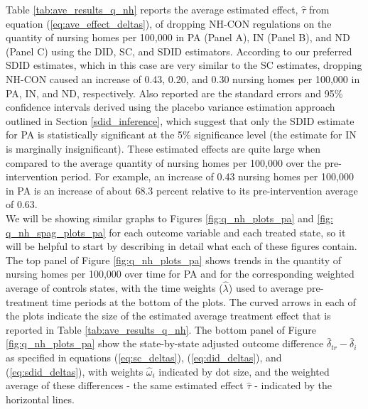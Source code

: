\documentclass[../Main.tex]{subfiles}
\begin{document}
\indent Table \ref{tab:ave_results_q_nh} reports the average estimated effect, $\hat{\tau}$ from equation (\ref{eq:ave_effect_deltas}), of dropping NH-CON regulations on the quantity of nursing homes per 100,000 in PA (Panel A), IN (Panel B), and ND (Panel C) using the DID, SC, and SDID estimators. According to our preferred SDID estimates, which in this case are very similar to the SC estimates, dropping NH-CON caused an increase of 0.43, 0.20, and 0.30 nursing homes per 100,000 in PA, IN, and ND, respectively. Also reported are the standard errors and 95\% confidence intervals derived using the placebo variance estimation approach outlined in Section \ref{sdid_inference}, which suggest that only the SDID estimate for PA is statistically significant at the 5\% significance level (the estimate for IN is marginally insignificant). These estimated effects are quite large when compared to the average quantity of nursing homes per 100,000 over the pre-intervention period. For example, an increase of 0.43 nursing homes per 100,000 in PA is an increase of about 68.3 percent relative to its pre-intervention average of 0.63.\\
\indent We will be showing similar graphs to Figures \ref{fig:q_nh_plots_pa} and \ref{fig: q_nh_spag_plots_pa} for each outcome variable and each treated state, so it will be helpful to start by describing in detail what each of these figures contain. The top panel of Figure \ref{fig:q_nh_plots_pa} shows trends in the quantity of nursing homes per 100,000 over time for PA and for the corresponding weighted average of controls states, with the time weights ($\hat{\lambda}$) used to average pre-treatment time periods at the bottom of the plots. The curved arrows in each of the plots indicate the size of the estimated average treatment effect that is reported in Table \ref{tab:ave_results_q_nh}. The bottom panel of Figure \ref{fig:q_nh_plots_pa} show the state-by-state adjusted outcome difference $\hat{\delta}_{tr}-\hat{\delta}_i$ as specified in equations (\ref{eq:sc_deltas}), (\ref{eq:did_deltas}), and (\ref{eq:sdid_deltas}), with weights $\hat{\omega}_i$ indicated by dot size, and the weighted average of these differences - the same estimated effect $\hat{\tau}$ - indicated by the horizontal lines.\\
\end{document}

